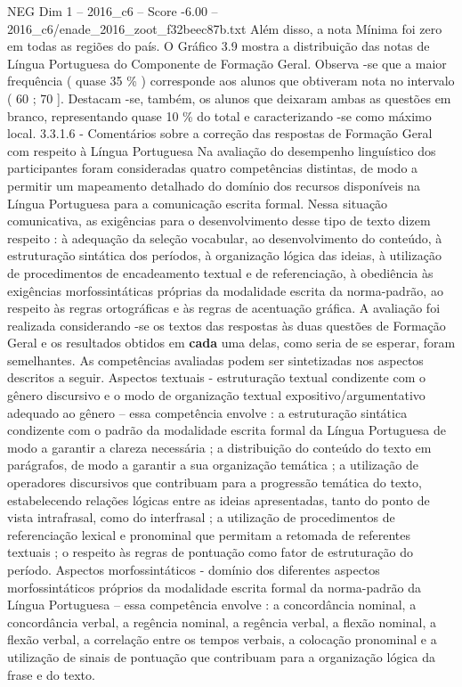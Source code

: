 \begin{textsample}{NEG Dim 1 – 2016\_c6 – Score -6.00 – 2016\_c6/enade\_2016\_zoot\_f32beec87b.txt}
Além disso, a nota Mínima foi zero em todas as regiões do país.
O Gráfico 3.9 mostra a distribuição das notas de Língua Portuguesa do Componente de Formação Geral.
Observa -se que a maior frequência ( quase 35 \% ) corresponde aos alunos que obtiveram nota no intervalo ( 60 ; 70 ].
Destacam -se, também, os alunos que deixaram ambas as questões em branco, representando quase 10 \% do total e caracterizando -se como máximo local. 3.3.1.6 - Comentários sobre a correção das respostas de Formação Geral com respeito à Língua Portuguesa Na avaliação do desempenho linguístico dos participantes foram consideradas quatro competências distintas, de modo a permitir um mapeamento detalhado do domínio dos recursos disponíveis na Língua Portuguesa para a comunicação escrita formal.
Nessa situação comunicativa, as exigências para o desenvolvimento desse tipo de texto dizem respeito : à adequação da seleção vocabular, ao desenvolvimento do conteúdo, à estruturação sintática dos períodos, à organização lógica das ideias, à utilização de procedimentos de encadeamento textual e de referenciação, à obediência às exigências morfossintáticas próprias da modalidade escrita da norma-padrão, ao respeito às regras ortográficas e às regras de acentuação gráfica.
A avaliação foi realizada considerando -se os textos das respostas às duas questões de Formação Geral e os resultados obtidos em \textbf{cada} uma delas, como seria de se esperar, foram semelhantes.
As competências avaliadas podem ser sintetizadas nos aspectos descritos a seguir.
Aspectos textuais - estruturação textual condizente com o gênero discursivo e o modo de organização textual expositivo/argumentativo adequado ao gênero – essa competência envolve : a estruturação sintática condizente com o padrão da modalidade escrita formal da Língua Portuguesa de modo a garantir a clareza necessária ; a distribuição do conteúdo do texto em parágrafos, de modo a garantir a sua organização temática ; a utilização de operadores discursivos que contribuam para a progressão temática do texto, estabelecendo relações lógicas entre as ideias apresentadas, tanto do ponto de vista intrafrasal, como do interfrasal ; a utilização de procedimentos de referenciação lexical e pronominal que permitam a retomada de referentes textuais ; o respeito às regras de pontuação como fator de estruturação do período.
Aspectos morfossintáticos - domínio dos diferentes aspectos morfossintáticos próprios da modalidade escrita formal da norma-padrão da Língua Portuguesa – essa competência envolve : a concordância nominal, a concordância verbal, a regência nominal, a regência verbal, a flexão nominal, a flexão verbal, a correlação entre os tempos verbais, a colocação pronominal e a utilização de sinais de pontuação que contribuam para a organização lógica da frase e do texto.

\end{textsample}

